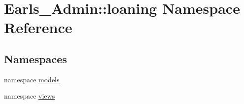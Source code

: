 \hypertarget{namespaceEarls__Admin_1_1loaning}{
\section{Earls\_\-Admin::loaning Namespace Reference}
\label{namespaceEarls__Admin_1_1loaning}
}


\subsection*{Namespaces}
\begin{CompactItemize}
\item 
namespace \hyperlink{namespaceEarls__Admin_1_1loaning_1_1models}{models}
\item 
namespace \hyperlink{namespaceEarls__Admin_1_1loaning_1_1views}{views}
\end{CompactItemize}
